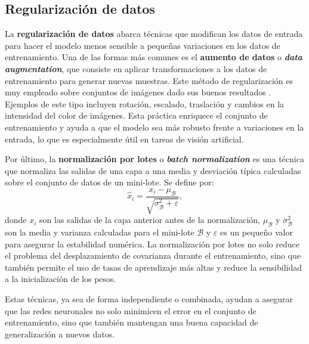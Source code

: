 \subsection{Regularización de datos}

La \textbf{regularización de datos} abarca técnicas que modifican los datos de
entrada para hacer el modelo menos sensible a pequeñas variaciones en los datos
de entrenamiento. Una de las formas más comunes es el \textbf{aumento de datos}
o \textbf{\textit{data augmentation}}, que consiste en aplicar transformaciones
a los datos de entrenamiento para generar nuevas muestras. Este método de regularización
es muy empleado sobre conjuntos de imágenes dado sus buenos resultados \cite{krizhevsky2012imagenet}.
Ejemplos de este tipo incluyen rotación, escalado, traslación y cambios en la
intensidad del color de imágenes. Esta práctica enriquece el conjunto de entrenamiento
y ayuda a que el modelo sea más robusto frente a variaciones en la entrada, lo
que es especialmente útil en tareas de visión artificial.

Por último, la \textbf{normalización por lotes} o \textbf{\textit{batch
		normalization}} \cite{ioffe2015batchnormalizationacceleratingdeep} es una técnica
que normaliza las salidas de una capa a una media y desviación típica calculadas
sobre el conjunto de datos de un mini-lote. Se define por:
\begin{equation}
	\hat{x}_{i} = \frac{x_{i} - \mu_{\mathcal{B}}}{\sqrt{\sigma^{2}_{\mathcal{B}}+
			\varepsilon}},
\end{equation}
donde $x_{i}$ son las salidas de la capa anterior antes de la normalización,
$\mu_{\mathcal{B}}$ y $\sigma^{2}_{\mathcal{B}}$ son la media y varianza
calculadas para el mini-lote $\mathcal{B}$ y $\varepsilon$ es un pequeño valor
para asegurar la estabilidad numérica. La normalización por lotes no solo reduce
el problema del desplazamiento de covarianza durante el entrenamiento, sino que
también permite el uso de tasas de aprendizaje más altas y reduce la
sensibilidad a la inicialización de los pesos.

Estas técnicas, ya sea de forma independiente o combinada, ayudan a asegurar que
las redes neuronales no solo minimicen el error en el conjunto de entrenamiento,
sino que también mantengan una buena capacidad de generalización a nuevos datos.

\endinput
